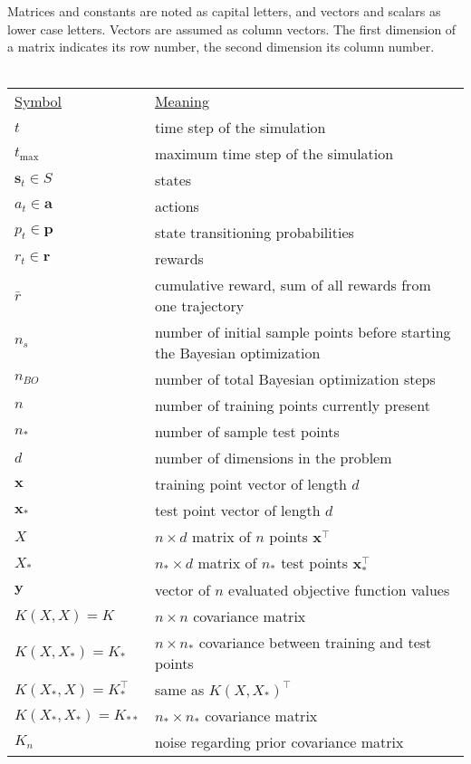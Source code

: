 Matrices and constants are noted as capital letters, and vectors and scalars as lower case letters. Vectors are assumed as column vectors. The first dimension of a matrix indicates its row number, the second dimension its column number.\\
\\
\begin{tabular}{l l}
    \underline{Symbol} & \underline{Meaning}\\
    $t$ & time step of the simulation\\
    $t_\mathrm{max}$ & maximum time step of the simulation\\
    $\mathbf{s}_t \in S$ & states\\
    $a_t \in \mathbf{a}$ & actions\\
    $p_t \in \mathbf{p}$ & state transitioning probabilities\\
    $r_t \in \mathbf{r}$ & rewards\\
    $\bar{r}$ & cumulative reward, sum of all rewards from one trajectory\\
    $n_{s}$ & number of initial sample points before starting the Bayesian optimization\\
    $n_{BO}$ & number of total Bayesian optimization steps\\
    $n$ & number of training points currently present\\
    $n_*$ & number of sample test points\\
    $d$ & number of dimensions in the problem\\
    $\mathbf{x}$ & training point vector of length $d$\\
    $\mathbf{x_*}$ & test point vector of length $d$\\
    $X$ & $n \times d$ matrix of $n$ points $\mathbf{x}^{\top}$\\
    $X_*$ & $n_* \times d$ matrix of $n_*$ test points $\mathbf{x}^{\top}_*$\\
    $\mathbf{y}$ & vector of $n$ evaluated objective function values\\
    $K(X,X) = K$ & $n \times n$ covariance matrix\\
    $K(X,X_*) = K_*$ & $n \times n_*$ covariance between training and test points\\
    $K(X_*,X) = K_*^\top$ & same as $K(X,X_*)^{\top}$\\
    $K(X_*,X_*) = K_{**}$ & $n_* \times n_*$ covariance matrix\\
    $K_n$ & noise regarding prior covariance matrix\\

\end{tabular}
